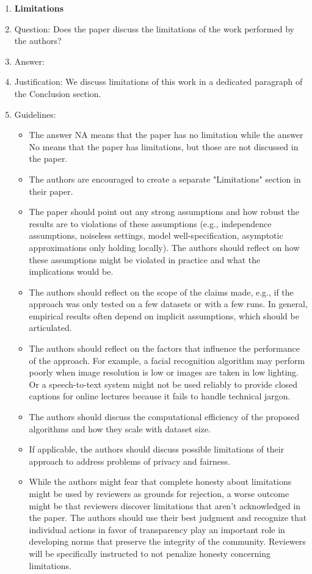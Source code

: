 \documentclass{article}
\begin{document}
\begin{enumerate}
\item {\bf Limitations}
    \item[] Question: Does the paper discuss the limitations of the work performed by the authors?
    \item[] Answer: \answerYes{} %
    \item[] Justification: We discuss limitations of this work in a dedicated paragraph of the Conclusion section.
    \item[] Guidelines:
    \begin{itemize}
        \item The answer NA means that the paper has no limitation while the answer No means that the paper has limitations, but those are not discussed in the paper.
        \item The authors are encouraged to create a separate "Limitations" section in their paper.
        \item The paper should point out any strong assumptions and how robust the results are to violations of these assumptions (e.g., independence assumptions, noiseless settings, model well-specification, asymptotic approximations only holding locally). The authors should reflect on how these assumptions might be violated in practice and what the implications would be.
        \item The authors should reflect on the scope of the claims made, e.g., if the approach was only tested on a few datasets or with a few runs. In general, empirical results often depend on implicit assumptions, which should be articulated.
        \item The authors should reflect on the factors that influence the performance of the approach. For example, a facial recognition algorithm may perform poorly when image resolution is low or images are taken in low lighting. Or a speech-to-text system might not be used reliably to provide closed captions for online lectures because it fails to handle technical jargon.
        \item The authors should discuss the computational efficiency of the proposed algorithms and how they scale with dataset size.
        \item If applicable, the authors should discuss possible limitations of their approach to address problems of privacy and fairness.
        \item While the authors might fear that complete honesty about limitations might be used by reviewers as grounds for rejection, a worse outcome might be that reviewers discover limitations that aren't acknowledged in the paper. The authors should use their best judgment and recognize that individual actions in favor of transparency play an important role in developing norms that preserve the integrity of the community. Reviewers will be specifically instructed to not penalize honesty concerning limitations.
    \end{itemize}


\end{enumerate}
\end{document}
